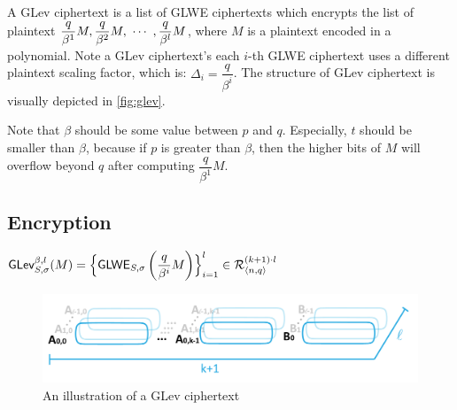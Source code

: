 A GLev ciphertext is a list of GLWE ciphertexts which encrypts the list of plaintext $\dfrac{q}{\beta^1}M, \dfrac{q}{\beta^2}M, \text{ } \text{$\cdots$} \text{ }, \dfrac{q}{\beta^l}M$, where $M$ is a plaintext encoded in a polynomial. Note  a GLev ciphertext's each $i$-th GLWE ciphertext uses a different plaintext scaling factor, which is: $\Delta_i = \dfrac{q}{\beta^i}$. The structure of GLev ciphertext is visually depicted in \autoref{fig:glev}.

Note that $\beta$ should be some value between $p$ and $q$. Especially, $t$ should be smaller than $\beta$, because if $p$ is greater than $\beta$, then the higher bits of $M$ will overflow beyond $q$ after computing $\dfrac{q}{\beta^1}M$. 


\subsection{Encryption}
\label{subsec:glev-enc}

\begin{tcolorbox}[title={\textbf{\tboxlabel{\ref*{subsec:glev-enc}} GLev Encryption}}]


$\textsf{GLev}_{S, \sigma}^{\beta, l}(M) = \Bigl \{\textsf{GLWE}_{S, \sigma}\left(\dfrac{q}{\beta^i} M\right)  \Bigr \}_{i=1}^{l} \in \mathcal{R}_{\langle n, q \rangle }^{(k+1) \cdot l}$
\end{tcolorbox}

\begin{figure}[h!]
    \centering
  \includegraphics[width=1.0\linewidth]{figures/TFHE-fig2.pdf}
  \caption{An illustration of a GLev ciphertext }
  \label{fig:glev}
\end{figure}


